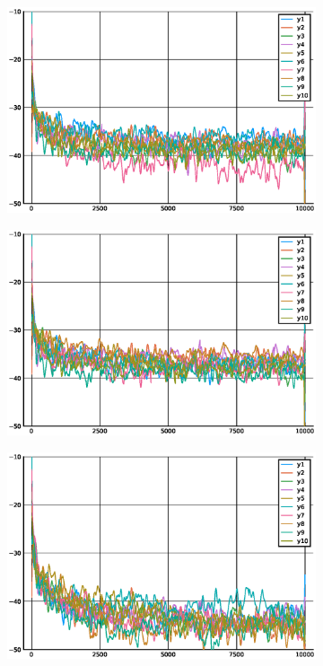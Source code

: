 \begin{figure}
    \centering
    \begin{subfigure}[b]{0.45\linewidth}
        \includegraphics[width=\linewidth]{figuras/err2_nc_sparse.eps}
        \caption{}
        \label{fig:err2_nc}
    \end{subfigure}
    \begin{subfigure}[b]{0.45\linewidth}
        \includegraphics[width=\linewidth]{figuras/err2_cc_sparse.eps}
        \caption{}
        \label{fig:err2_cc}
    \end{subfigure}
    \begin{subfigure}[b]{0.45\linewidth}
        \includegraphics[width=\linewidth]{figuras/err2_gs_sparse.eps}

\end{subfigure}
\end{figure}
